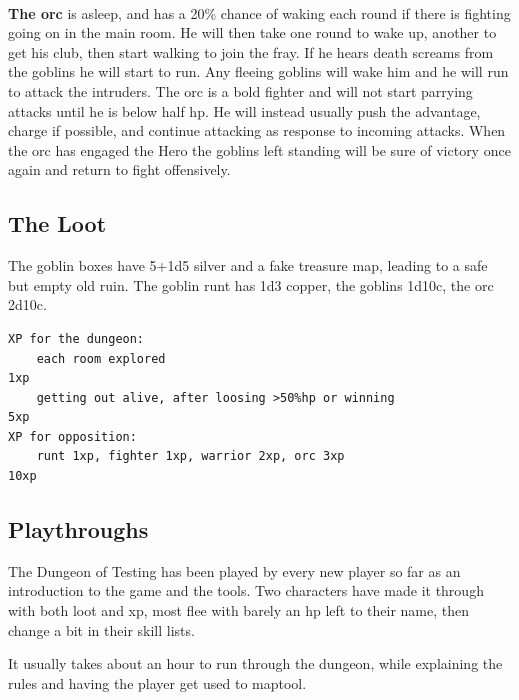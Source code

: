 \

\textbf{The orc} is asleep, and has a 20\% chance of waking each round if there is fighting going on in the main room. He will then take one round to wake up, another to get his club, then start walking to join the fray. If he hears death screams from the goblins he will start to run. Any fleeing goblins will wake him and he will run to attack the intruders. The orc is a bold fighter and will not start parrying attacks until he is below half hp. He will instead usually push the advantage, charge if possible, and continue attacking as response to incoming attacks.
When the orc has engaged the Hero the goblins left standing will be sure of victory once again and return to fight offensively.


\subsection*{The Loot}

The goblin boxes have 5+1d5 silver and a fake treasure map, leading to a safe but empty old ruin. The goblin runt has 1d3 copper, the goblins 1d10c, the orc 2d10c.\\
\begin{samepage} \small \begin{verbatim}
XP for the dungeon:
    each room explored                                                     1xp
    getting out alive, after loosing >50%hp or winning                     5xp
XP for opposition:
    runt 1xp, fighter 1xp, warrior 2xp, orc 3xp                           10xp
\end{verbatim} \end{samepage} \normalsize


\subsection*{Playthroughs}

The Dungeon of Testing has been played by every new player so far as an introduction to the game and the tools. Two characters have made it through with both loot and xp, most flee with barely an hp left to their name, then change a bit in their skill lists.

It usually takes about an hour to run through the dungeon, while explaining the rules and having the player get used to maptool.









